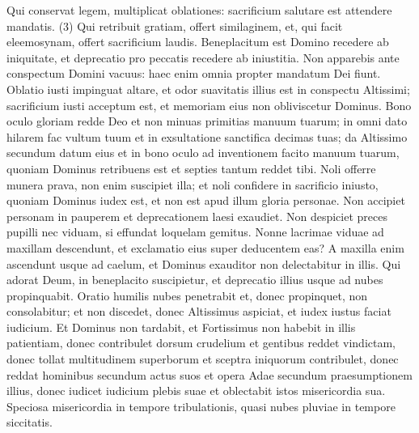 \begin{biblechapter}  
\verse Qui conservat legem, multiplicat oblationes: 
\verse sacrificium salutare est attendere mandatis. (3) 
\verse Qui retribuit gratiam, offert similaginem, et, qui facit eleemosynam, offert sacrificium laudis. 
\verse Beneplacitum est Domino recedere ab iniquitate, et deprecatio pro peccatis recedere ab iniustitia. 
\verse Non apparebis ante conspectum Domini vacuus: 
\verse haec enim omnia propter mandatum Dei fiunt. 
\verse Oblatio iusti impinguat altare, et odor suavitatis illius est in conspectu Altissimi; 
\verse sacrificium iusti acceptum est, et memoriam eius non obliviscetur Dominus. 
\verse Bono oculo gloriam redde Deo et non minuas primitias manuum tuarum; 
\verse in omni dato hilarem fac vultum tuum et in exsultatione sanctifica decimas tuas; 
\verse da Altissimo secundum datum eius et in bono oculo ad inventionem facito manuum tuarum, 
\verse quoniam Dominus retribuens est et septies tantum reddet tibi. 
\verse Noli offerre munera prava, non enim suscipiet illa; 
\verse et noli confidere in sacrificio iniusto, quoniam Dominus iudex est, et non est apud illum gloria personae. 
\verse Non accipiet personam in pauperem et deprecationem laesi exaudiet. 
\verse Non despiciet preces pupilli nec viduam, si effundat loquelam gemitus. 
\verse Nonne lacrimae viduae ad maxillam descendunt, et exclamatio eius super deducentem eas? 
\verse A maxilla enim ascendunt usque ad caelum, et Dominus exauditor non delectabitur in illis. 
\verse Qui adorat Deum, in beneplacito suscipietur, et deprecatio illius usque ad nubes propinquabit. 
\verse Oratio humilis nubes penetrabit et, donec propinquet, non consolabitur; et non discedet, donec Altissimus aspiciat, et iudex iustus faciat iudicium. 
\verse Et Dominus non tardabit, et Fortissimus non habebit in illis patientiam, donec contribulet dorsum crudelium 
\verse et gentibus reddet vindictam, donec tollat multitudinem superborum et sceptra iniquorum contribulet, 
\verse donec reddat hominibus secundum actus suos et opera Adae secundum praesumptionem illius, 
\verse donec iudicet iudicium plebis suae et oblectabit istos misericordia sua. 
\verse Speciosa misericordia in tempore tribulationis, quasi nubes pluviae in tempore siccitatis. 
\end{biblechapter}

